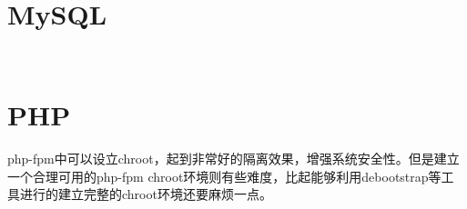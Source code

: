 \begin{lstlisting}[language=bash]

\end{lstlisting}




\begin{lstlisting}[language=bash]

\end{lstlisting}




\begin{lstlisting}[language=bash]

\end{lstlisting}




\begin{lstlisting}[language=bash]

\end{lstlisting}




\section{MySQL}








\begin{lstlisting}[language=bash]

\end{lstlisting}





\begin{lstlisting}[language=bash]

\end{lstlisting}


\section{PHP}

php-fpm中可以设立chroot，起到非常好的隔离效果，增强系统安全性。但是建立一个合理可用的php-fpm chroot环境则有些难度，比起能够利用debootstrap等工具进行的建立完整的chroot环境还要麻烦一点。




\begin{lstlisting}[language=bash]

\end{lstlisting}



